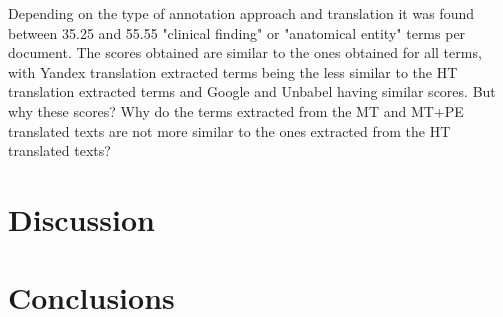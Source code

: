 Depending on the type of annotation approach and translation it was found between 35.25 and 55.55 "clinical finding" or "anatomical entity" terms per document. The scores obtained are similar to the ones obtained for all terms, with Yandex translation extracted terms being the less similar to the HT translation extracted terms and Google and Unbabel having similar scores. But why these scores? Why do the terms extracted from the MT and MT+PE translated texts are not more similar to the ones extracted from the HT translated texts? 


\section{Discussion}





\section{Conclusions}




  
